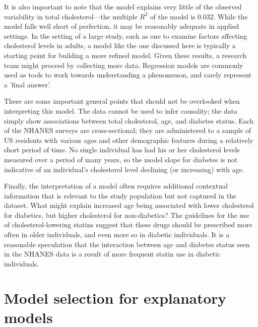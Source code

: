 
It is also important to note that the model explains very little of the observed variability in total cholesterol---the multiple $R^2$ of the model is 0.032. While the model falls well short of perfection, it may be reasonably adequate in applied settings. In the setting of a large study, such as one to examine factors affecting cholesterol levels in adults, a model like the one discussed here is typically a starting point for building a more refined model. Given these results, a research team might proceed by collecting more data. Regression models are commonly used as tools to work towards understanding a phenomenon, and rarely represent a 'final answer'.

There are some important general points that should not be overlooked when interpreting this model. The data cannot be used to infer causality; the data simply show associations between total cholesterol, age, and diabetes status. Each of the NHANES surveys are cross-sectional; they are administered to a sample of US residents with various ages and other demographic features during a relatively short period of time.  No single individual has had his or her cholesterol levels measured over a period of many years, so the model slope for diabetes is not indicative of an individual's cholesterol level declining (or increasing) with age.

Finally, the interpretation of a model often requires additional contextual information that is relevant to the study population but not captured in the dataset. What might explain increased age being associated with lower cholesterol for diabetics, but higher cholesterol for non-diabetics? The guidelines for the use of cholesterol-lowering statins suggest that these drugs should be prescribed more often in older individuals, and even more so in diabetic individuals. It is a reasonable speculation that the interaction between age and diabetes status seen in the NHANES data is a result of more frequent statin use in diabetic individuals.

\newpage

\section{Model selection for explanatory models}
\label{modelSelection}


